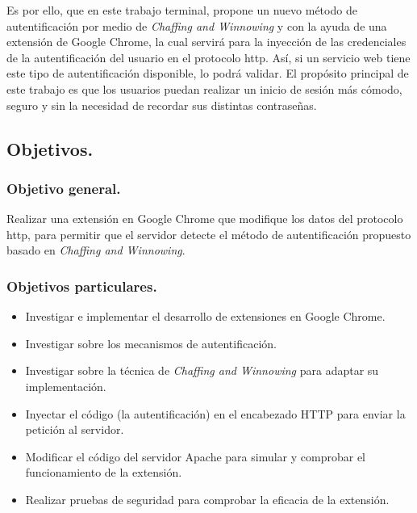\documentclass[12pt, a4paper, titlepage]{article}
\begin{document}
		Es por ello, que en este trabajo terminal, propone un nuevo método de autentificación por medio de \textit{Chaffing and Winnowing} y con la ayuda de una extensión de Google Chrome, la cual servirá para la inyección de las credenciales de la autentificación del usuario en el protocolo \acrshort{http}. Así, si un servicio web tiene este tipo de autentificación disponible, lo podrá validar. El propósito principal de este trabajo es que los usuarios puedan realizar un inicio de sesión más cómodo, seguro y sin la necesidad de recordar sus distintas contraseñas.
		
		\newpage
			
		\subsection{Objetivos.}
			\subsubsection{Objetivo general. }
			Realizar una extensión en Google Chrome que modifique los datos del protocolo \acrshort{http}, para permitir que el servidor detecte el método de autentificación propuesto basado en \textit{Chaffing and Winnowing}.\\
			\subsubsection{Objetivos particulares.}
			\begin{itemize}
				\item Investigar e implementar el desarrollo de extensiones en Google Chrome.
				\item Investigar sobre los mecanismos de autentificación.
				\item Investigar sobre la técnica de \textit{Chaffing and Winnowing} para adaptar su implementación.
				\item Inyectar el código (la autentificación) en el encabezado HTTP para enviar la petición al servidor. 
				\item Modificar el código del servidor Apache para simular y comprobar el funcionamiento de la extensión.
				\item Realizar pruebas de seguridad para comprobar la eficacia de la extensión. 
			\end{itemize}
\end{document}
